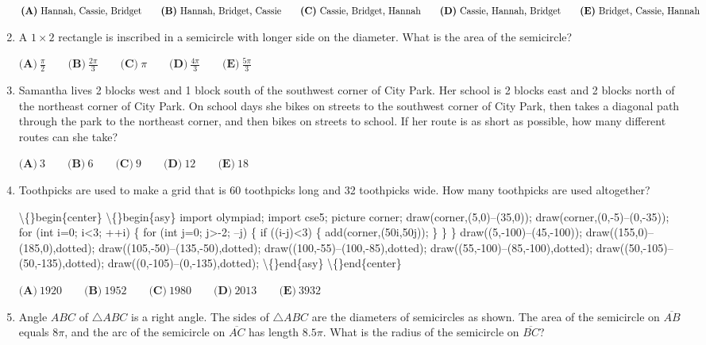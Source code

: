 \documentclass{article}
\begin{document}
\begin{enumerate}[label=\arabic*., itemsep=0.5em]
\(\textbf{(A)}\ \text{Hannah, Cassie, Bridget} \qquad \textbf{(B)}\ \text{Hannah, Bridget, Cassie} \\ \qquad \textbf{(C)}\ \text{Cassie, Bridget, Hannah} \qquad \textbf{(D)}\ \text{Cassie, Hannah, Bridget} \\ \qquad \textbf{(E)}\ \text{Bridget, Cassie, Hannah}\)\par \vspace{0.5em}\item A \(1\times 2\) rectangle is inscribed in a semicircle with longer side on the diameter. What is the area of the semicircle?

\(\textbf{(A)}\ \frac\pi2 \qquad \textbf{(B)}\ \frac{2\pi}3 \qquad \textbf{(C)}\ \pi \qquad \textbf{(D)}\ \frac{4\pi}3 \qquad \textbf{(E)}\ \frac{5\pi}3\)\par \vspace{0.5em}\item Samantha lives 2 blocks west and 1 block south of the southwest corner of City Park. Her school is 2 blocks east and 2 blocks north of the northeast corner of City Park. On school days she bikes on streets to the southwest corner of City Park, then takes a diagonal path through the park to the northeast corner, and then bikes on streets to school. If her route is as short as possible, how many different routes can she take?

\(\textbf{(A)}\ 3 \qquad \textbf{(B)}\ 6 \qquad \textbf{(C)}\ 9 \qquad \textbf{(D)}\ 12 \qquad \textbf{(E)}\ 18\)\par \vspace{0.5em}\item Toothpicks are used to make a grid that is 60 toothpicks long and 32 toothpicks wide. How many toothpicks are used altogether?


\textbackslash\{\}begin\{center\}
\textbackslash\{\}begin\{asy\}
import olympiad;
import cse5;
picture corner;
draw(corner,(5,0)--(35,0));
draw(corner,(0,-5)--(0,-35));
for (int i=0; i<3; ++i)
\{
for (int j=0; j>-2; --j)
\{
if ((i-j)<3)
\{
add(corner,(50i,50j));
\}
\}
\}
draw((5,-100)--(45,-100));
draw((155,0)--(185,0),dotted);
draw((105,-50)--(135,-50),dotted);
draw((100,-55)--(100,-85),dotted);
draw((55,-100)--(85,-100),dotted);
draw((50,-105)--(50,-135),dotted);
draw((0,-105)--(0,-135),dotted);
\textbackslash\{\}end\{asy\}
\textbackslash\{\}end\{center\}


\(\textbf{(A)}\ 1920 \qquad \textbf{(B)}\ 1952 \qquad \textbf{(C)}\ 1980 \qquad \textbf{(D)}\ 2013 \qquad \textbf{(E)}\ 3932\)\par \vspace{0.5em}\item Angle \(ABC\) of \(\triangle ABC\) is a right angle. The sides of \(\triangle ABC\) are the diameters of semicircles as shown. The area of the semicircle on \(\overline{AB}\) equals \(8\pi\), and the arc of the semicircle on \(\overline{AC}\) has length \(8.5\pi\). What is the radius of the semicircle on \(\overline{BC}\)?



\end{enumerate}
\end{document}
